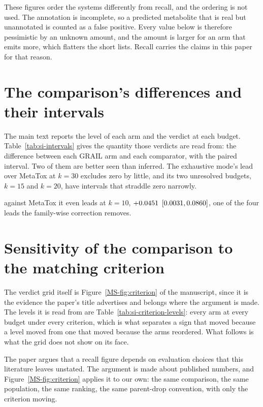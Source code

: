 \documentclass[journal=jcisd8,manuscript=suppinfo,layout=onecolumn]{achemso}
\begin{document}
These figures order the systems differently from recall, and the ordering is not used. The
annotation is incomplete, so a predicted metabolite that is real but unannotated is counted as a
false positive. Every value below is therefore pessimistic by an unknown amount, and the amount is
larger for an arm that emits more, which flatters the short lists. Recall carries the claims in
this paper for that reason.



\section{The comparison's differences and their intervals}
\label{sec:si-intervals}



The main text reports the level of each arm and the verdict at each budget.
Table~\ref{tab:si-intervals}
gives the quantity those verdicts are read from: the difference between each GRAIL arm and each
comparator, with the paired interval. Two of them are better seen than inferred. The
exhaustive mode's lead over MetaTox at $k=30$ excludes zero by little, and its two unresolved
budgets, $k=15$ and $k=20$, have intervals that straddle zero narrowly.


against
MetaTox it even leads at $k=10$, $+0.0451$
$[0.0031, 0.0860]$, one of the four leads the
family-wise correction removes.
\section{Sensitivity of the comparison to the matching criterion}
\label{sec:si-sensitivity}

The verdict grid itself is Figure~\ref{MS-fig:criterion} of the manuscript, since it is the
evidence the paper's title advertises and belongs where the argument is made. The levels it is
read from are Table~\ref{tab:si-criterion-levels}: every arm at every budget under every
criterion, which is what separates a sign that moved because a level moved from one that moved
because the
arms reordered. What follows is what the grid does not show on its face.



The paper argues that a recall figure depends on evaluation choices that this literature leaves
unstated. The argument is made about published numbers, and Figure~\ref{MS-fig:criterion} applies
it to our own: the same comparison, the same population, the same ranking, the same parent-drop
convention, with only the criterion moving.
\end{document}
